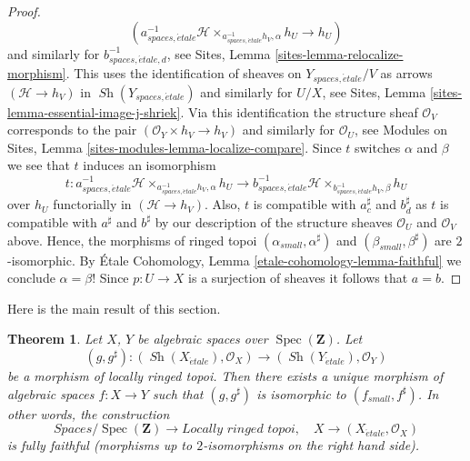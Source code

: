 \documentclass{stacks-project}
\theoremstyle{plain}
\newtheorem{theorem}[subsection]{Theorem}
\theoremstyle{definition}
\theoremstyle{remark}
\numberwithin{equation}{subsection}
\def\Spec{\mathop{\mathrm{Spec}}}
\def\Sh{\mathop{\mathit{Sh}}\nolimits}
\def\etale{{\acute{e}tale}}
\begin{document}
\begin{proof}
$$(a_{spaces, \etale}^{-1}\mathcal{H}
\times_{a_{spaces, \etale}^{-1}h_V, \alpha}
h_U \to
h_U)
$$
and similarly for $b_{spaces, \etale, d}^{-1}$, see
Sites, Lemma \ref{sites-lemma-relocalize-morphism}.
This uses the identification of sheaves on $Y_{spaces, \etale}/V$
as arrows $(\mathcal{H} \to h_V)$ in $\Sh(Y_{spaces, \etale})$
and similarly for $U/X$, see
Sites, Lemma \ref{sites-lemma-essential-image-j-shriek}.
Via this identification the structure sheaf $\mathcal{O}_V$ corresponds to the
pair $(\mathcal{O}_Y \times h_V \to h_V)$ and similarly
for $\mathcal{O}_U$, see
Modules on Sites,
Lemma \ref{sites-modules-lemma-localize-compare}.
Since $t$ switches $\alpha$ and $\beta$ we see that $t$ induces an isomorphism
$$
t :
a_{spaces, \etale}^{-1}\mathcal{H}
\times_{a_{spaces, \etale}^{-1}h_V, \alpha}
h_U
\longrightarrow
b_{spaces, \etale}^{-1}\mathcal{H}
\times_{b_{spaces, \etale}^{-1}h_V, \beta}
h_U
$$
over $h_U$ functorially in $(\mathcal{H} \to h_V)$. Also, $t$ is compatible
with $a_c^\sharp$ and $b_d^\sharp$ as $t$ is
compatible with $a^\sharp$ and $b^\sharp$ by our description
of the structure sheaves $\mathcal{O}_U$ and $\mathcal{O}_V$
above. Hence, the morphisms of ringed topoi
$(\alpha_{small}, \alpha^\sharp)$ and $(\beta_{small}, \beta^\sharp)$
are $2$-isomorphic. By
\'Etale Cohomology, Lemma \ref{etale-cohomology-lemma-faithful}
we conclude $\alpha = \beta$! Since $p : U \to X$ is a surjection
of sheaves it follows that $a = b$.
\end{proof}

\noindent
Here is the main result of this section.

\begin{theorem}
\label{theorem-fully-faithful}
Let $X$, $Y$ be algebraic spaces over $\Spec(\mathbf{Z})$.
Let
$$
(g, g^\sharp) :
(\Sh(X_\etale), \mathcal{O}_X)
\longrightarrow
(\Sh(Y_\etale), \mathcal{O}_Y)
$$
be a morphism of locally ringed topoi. Then there exists a
unique morphism of algebraic spaces $f : X \to Y$ such that
$(g, g^\sharp)$ is isomorphic to $(f_{small}, f^\sharp)$.
In other words, the construction
$$
\textit{Spaces}/\Spec(\mathbf{Z})
\longrightarrow \textit{Locally ringed topoi},
\quad
X \longrightarrow (X_\etale, \mathcal{O}_X)
$$
is fully faithful (morphisms up to $2$-isomorphisms on the right hand side).
\end{theorem}
\end{document}
